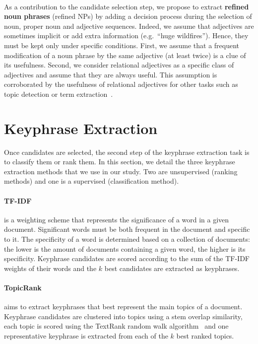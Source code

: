   \paragraph{}
  As a contribution to the candidate selection step, we propose to extract
  \textbf{refined noun phrases} (refined NPs) by adding a decision process
  during the selection of noun, proper noun and adjective sequences. Indeed,
  we assume that adjectives are sometimes implicit or add extra information
  (e.g.~``huge wildfires''). Hence, they must be kept only under specific
  conditions. First, we assume that a frequent modification of a noun phrase by
  the same adjective (at least twice) is a clue of its usefulness. Second, we
  consider relational adjectives as a specific class of adjectives and assume
  that they are always useful. This assumption is corroborated by the usefulness
  of relational adjectives for other tasks such as topic detection or term
  extraction~\cite{daille2001relationaladjectives}.

\section{Keyphrase Extraction}
\label{sec:keyphrase_extraction}
  Once candidates are selected, the second step of the keyphrase extraction task
  is to classify them or rank them. In this section, we detail the three
  keyphrase extraction methods that we use in our study. Two are unsupervised
  (ranking methods) and one is a supervised (classification method).

  \paragraph{TF-IDF~\textnormal{\cite{jones1972tfidf}}} is a weighting scheme
  that represents the significance of a word in a given document. Significant
  words must be both frequent in the document and specific to it. The
  specificity of a word is determined based on a collection of documents: the
  lower is the amount of documents containing a given word, the higher is its
  specificity. Keyphrase candidates are scored according to the sum of the
  TF-IDF weights of their words and the $k$ best candidates are extracted as
  keyphrases.

  \paragraph{TopicRank~\textnormal{\cite{bougouin2013topicrank}}} aims to
  extract keyphrases that best represent the main topics of a document.
  Keyphrase candidates are clustered into topics using a stem overlap
  similarity, each topic is scored using the TextRank random walk
  algorithm~\cite{mihalcea2004textrank} and one representative keyphrase is
  extracted from each of the $k$ best ranked topics.

